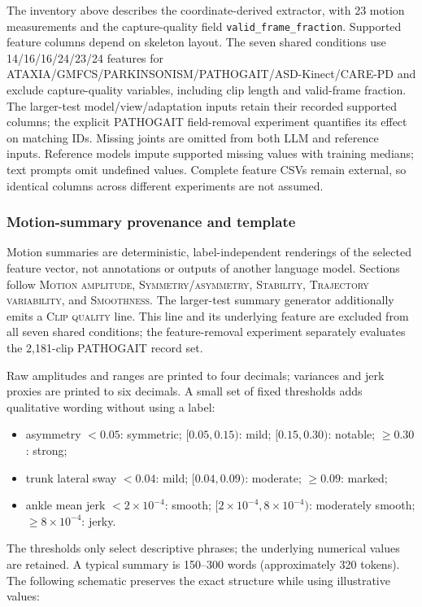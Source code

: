 The inventory above describes the coordinate-derived extractor, with 23 motion measurements and the capture-quality field \texttt{valid\_frame\_fraction}. Supported feature columns depend on skeleton layout. The seven shared conditions use 14/16/16/24/23/24 features for ATAXIA/GMFCS/PARKINSONISM/PATHOGAIT/ASD-Kinect/CARE-PD and exclude capture-quality variables, including clip length and valid-frame fraction. The larger-test model/view/adaptation inputs retain their recorded supported columns; the explicit PATHOGAIT field-removal experiment quantifies its effect on matching IDs. Missing joints are omitted from both LLM and reference inputs. Reference models impute supported missing values with training medians; text prompts omit undefined values. Complete feature CSVs remain external, so identical columns across different experiments are not assumed.

\subsubsection{Motion-summary provenance and template}
\label{sec:supp_summary_provenance}

Motion summaries are deterministic, label-independent renderings of the selected feature vector, not annotations or outputs of another language model. Sections follow \textsc{Motion amplitude}, \textsc{Symmetry/asymmetry}, \textsc{Stability}, \textsc{Trajectory variability}, and \textsc{Smoothness}. The larger-test summary generator additionally emits a \textsc{Clip quality} line. This line and its underlying feature are excluded from all seven shared conditions; the feature-removal experiment separately evaluates the 2,181-clip PATHOGAIT record set.

Raw amplitudes and ranges are printed to four decimals; variances and jerk proxies are printed to six decimals. A small set of fixed thresholds adds qualitative wording without using a label:
\begin{itemize}
\item asymmetry $<0.05$: symmetric; $[0.05,0.15)$: mild; $[0.15,0.30)$: notable; $\geq0.30$: strong;
\item trunk lateral sway $<0.04$: mild; $[0.04,0.09)$: moderate; $\geq0.09$: marked;
\item ankle mean jerk $<2\times10^{-4}$: smooth; $[2\times10^{-4},8\times10^{-4})$: moderately smooth; $\geq8\times10^{-4}$: jerky.
\end{itemize}
The thresholds only select descriptive phrases; the underlying numerical values are retained. A typical summary is 150--300 words (approximately 320 tokens). The following schematic preserves the exact structure while using illustrative values:

